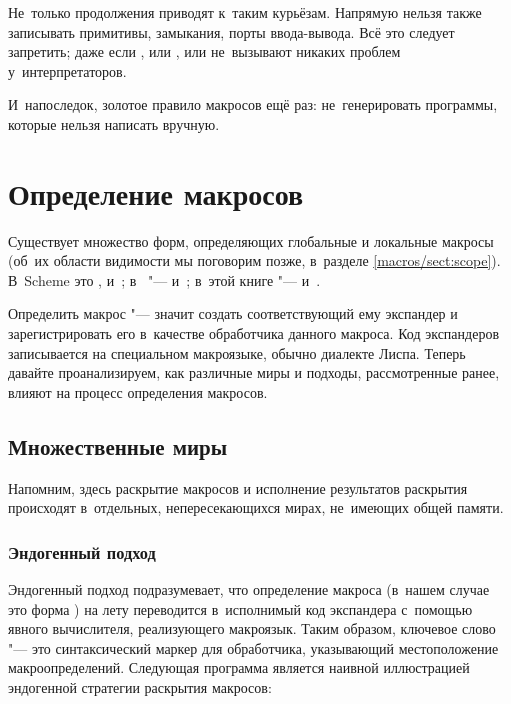 Не~только продолжения приводят к~таким курьёзам. Напрямую нельзя также
записывать примитивы, замыкания, порты ввода-вывода. Всё это следует запретить;
даже если , или , или  не~вызывают никаких проблем у~интерпретаторов.

И~напоследок, золотое правило макросов ещё раз: не~генерировать программы,
которые нельзя написать вручную.


\section{Определение макросов}\label{macros/sect:define}

Существует множество форм, определяющих глобальные и локальные макросы (об~их
области видимости мы поговорим позже, в~разделе \ref{macros/sect:scope}).
В~Scheme это ,  и~;
в~{\CommonLisp} "---  и~; в~этой книге "---
 и~.

Определить макрос "--- значит создать соответствующий ему экспандер и
зарегистрировать его в~качестве обработчика данного макроса. Код экспандеров
записывается на специальном макроязыке, обычно диалекте Лиспа. Теперь давайте
проанализируем, как различные миры и подходы, рассмотренные ранее, влияют на
процесс определения макросов.


\subsection{Множественные миры}\label{macros/define/ssect:multiple}

Напомним, здесь раскрытие макросов и исполнение результатов раскрытия происходят
в~отдельных, непересекающихся мирах, не~имеющих общей памяти.


\subsubsection{Эндогенный подход}\label{macros/define/multiple/sssect:endogeny}

Эндогенный подход подразумевает, что определение макроса (в~нашем случае это
форма ) на лету переводится в~исполнимый код экспандера
с~помощью явного вычислителя, реализующего макроязык. Таким образом, ключевое
слово  "--- это синтаксический маркер для обработчика,
указывающий местоположение макроопределений. Следующая программа является
наивной иллюстрацией эндогенной стратегии раскрытия макросов:

